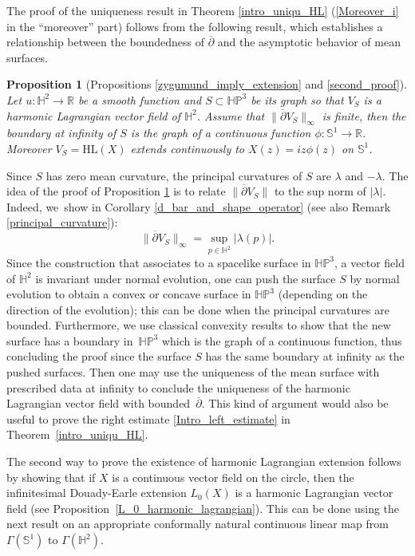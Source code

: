 \documentclass[JEP,XML,SOM,Unicode,NoEqCountersInSection, NoFloatCountersInSection,published]{cedram}
\theoremstyle{plain}
\newtheorem{prop}[cor]{Proposition}
\theoremstyle{definition}
\newcommand{\HP}{\mathbb{HP}^3}
\begin{document}
The proof of the uniqueness result in Theorem \ref{intro_uniqu_HL} (\ie \eqref{Moreover_i}  in the ``moreover'' part) follows from the following result, which establishes a relationship between the boundedness of \(\overline{\partial} \) and the asymptotic behavior of mean surfaces.

\begin{prop}[Propositions \ref{zygumund_imply_extension} and \ref{second_proof}]\label{intro_pro_bounded_imple_extension}
Let \(u: \mathbb{H}^2 \to \mathbb{R} \) be a smooth function and \(S \subset \HP \) be its graph so that \(V_S \) is a harmonic Lagrangian vector field of \(\mathbb{H}^2\). Assume that \(\lVert \overline{\partial} V_S \rVert_{\infty}\) is finite, then the boundary at infinity of \(S \) is the graph of a continuous function \(\phi: \mathbb{S}^1 \to \mathbb{R}\). Moreover $V_S=\mathrm{HL}(X)$ extends continuously to $X(z)=iz\phi(z)$ on $\mathbb{S}^1$.
\end{prop}

Since \(S \) has zero mean curvature, the principal curvatures of \(S \) are \(\lambda\) and \(-\lambda\). The idea of the proof of Proposition \ref{intro_pro_bounded_imple_extension} is to relate \(\lVert \overline{\partial} V_S \rVert\) to the sup norm of \(\lvert \lambda \rvert\). Indeed, we~show in Corollary \ref{d_bar_and_shape_operator} (see also Remark \ref{principal_curvature}):
\[
\lVert \overline{\partial} V_S \rVert_{\infty} = \sup_{p \in \mathbb{H}^2} \lvert \lambda(p) \rvert.
\]
Since the construction that associates to a spacelike surface in \(\HP\), a vector field of \(\mathbb{H}^2\) is invariant under normal evolution, one can push the surface \(S \) by normal evolution to obtain a convex or concave surface in \(\HP\) (depending on the direction of the evolution); this can be done when the principal curvatures are bounded. Furthermore, we use classical convexity results to show that the new surface has a boundary in~\(\HP\) which is the graph of a continuous function, thus concluding the proof since the surface \(S \) has the same boundary at infinity as the pushed surfaces. Then one may use the uniqueness of the mean surface with prescribed data at infinity to conclude the uniqueness of the harmonic Lagrangian vector field with bounded~\(\overline{\partial}\). This kind of argument would also be useful to prove the right estimate \eqref{Intro_left_estimate} in Theorem~\ref{intro_uniqu_HL}.

The second way to prove the existence of harmonic Lagrangian extension follows by showing that if \(X \) is a continuous vector field on the circle, then the infinitesimal Douady-Earle extension \(L_0(X) \) is a harmonic Lagrangian vector field (see Proposition~\ref{L_0_harmonic_lagrangian}). This can be done using the next result on an appropriate conformally natural continuous linear map from \(\Gamma(\mathbb{S}^1)\) to \(\Gamma(\mathbb{H}^2)\).
\end{document}
